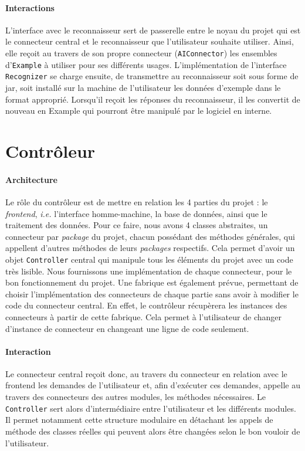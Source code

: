\paragraph{Interactions}
L'interface avec le reconnaisseur sert de passerelle entre le noyau du projet qui est le connecteur central et le reconnaisseur que l'utilisateur souhaite utiliser. Ainsi, elle reçoit au travers de son propre connecteur (\texttt{AIConnector}) les ensembles d'\texttt{Example} à utiliser pour ses différents usages. L'implémentation de l'interface \texttt{Recognizer} se charge ensuite, de transmettre au reconnaisseur soit sous forme de jar, soit installé sur la machine de l'utilisateur les données d'exemple dans le format approprié. Lorsqu'il reçoit les réponses du reconnaisseur, il les convertit de nouveau en Example qui pourront être manipulé par le logiciel en interne.

\section{Contrôleur}


\paragraph{Architecture}
Le rôle du contrôleur est de mettre en relation les 4 parties du projet : le \textit{frontend}, \textit{i.e.} l'interface homme-machine, la base de données, ainsi que le traitement des données. Pour ce faire, nous avons 4 classes abstraites, un connecteur par \textit{package} du projet, chacun possédant des méthodes générales, qui appellent d'autres méthodes de leurs \textit{packages} respectifs. Cela permet d'avoir un objet \texttt{Controller} central qui manipule tous les éléments du projet avec un code très lisible. Nous fournissons une implémentation de chaque connecteur, pour le bon fonctionnement du projet. Une fabrique est également prévue, permettant de choisir l'implémentation des connecteurs de chaque partie sans avoir à modifier le code du connecteur central. En effet, le contrôleur récupèrera les instances des connecteurs à partir de cette fabrique. Cela permet à l'utilisateur de changer d'instance de connecteur en changeant une ligne de code seulement.

\paragraph{Interaction}
Le connecteur central reçoit donc, au travers du connecteur en relation avec le frontend les demandes de l'utilisateur et, afin d'exécuter ces demandes, appelle au travers des connecteurs des autres modules, les méthodes nécessaires. Le \texttt{Controller} sert alors d'intermédiaire entre l'utilisateur et les différents modules. Il permet notamment cette structure modulaire en détachant les appels de méthode des classes réelles qui peuvent alors être changées selon le bon vouloir de l'utilisateur.
